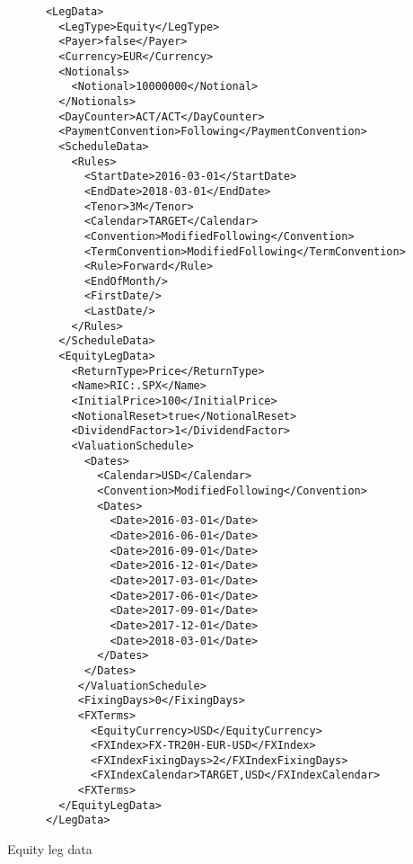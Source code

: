 \begin{listing}[H]
\begin{verbatim}
      <LegData>
        <LegType>Equity</LegType>
        <Payer>false</Payer>
        <Currency>EUR</Currency>
        <Notionals>
          <Notional>10000000</Notional>
        </Notionals>
        <DayCounter>ACT/ACT</DayCounter>
        <PaymentConvention>Following</PaymentConvention>
        <ScheduleData>
          <Rules>
            <StartDate>2016-03-01</StartDate>
            <EndDate>2018-03-01</EndDate>
            <Tenor>3M</Tenor>
            <Calendar>TARGET</Calendar>
            <Convention>ModifiedFollowing</Convention>
            <TermConvention>ModifiedFollowing</TermConvention>
            <Rule>Forward</Rule>
            <EndOfMonth/>
            <FirstDate/>
            <LastDate/>
          </Rules>
        </ScheduleData>
        <EquityLegData>
          <ReturnType>Price</ReturnType>
          <Name>RIC:.SPX</Name>
          <InitialPrice>100</InitialPrice>
          <NotionalReset>true</NotionalReset>
          <DividendFactor>1</DividendFactor>
          <ValuationSchedule>
            <Dates>
              <Calendar>USD</Calendar>
              <Convention>ModifiedFollowing</Convention>
              <Dates>
                <Date>2016-03-01</Date>
                <Date>2016-06-01</Date>
                <Date>2016-09-01</Date>
                <Date>2016-12-01</Date>
                <Date>2017-03-01</Date>
                <Date>2017-06-01</Date>
                <Date>2017-09-01</Date>
                <Date>2017-12-01</Date>
                <Date>2018-03-01</Date>
              </Dates>
            </Dates>
           </ValuationSchedule>
           <FixingDays>0</FixingDays>
           <FXTerms>
             <EquityCurrency>USD</EquityCurrency>
             <FXIndex>FX-TR20H-EUR-USD</FXIndex>
             <FXIndexFixingDays>2</FXIndexFixingDays>
             <FXIndexCalendar>TARGET,USD</FXIndexCalendar>
           <FXTerms>
        </EquityLegData>
      </LegData>
\end{verbatim}
\caption{Equity leg data}
\label{lst:equitylegdata}
\end{listing}
